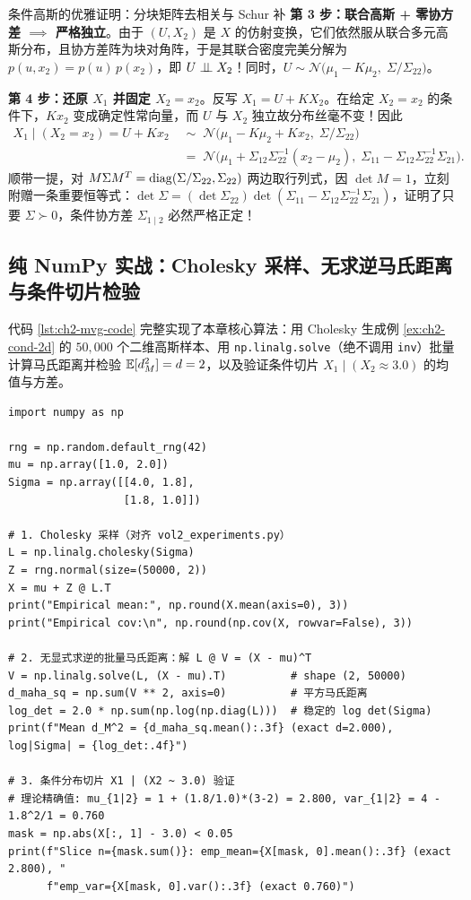 \begin{extBox}{条件高斯的优雅证明：分块矩阵去相关与 Schur 补}
\textbf{第 3 步：联合高斯 + 零协方差 $\implies$ 严格独立}。由于 $(U, X_2)$ 是 $X$ 的仿射变换，它们依然服从联合多元高斯分布，且协方差阵为块对角阵，于是其联合密度完美分解为 $p(u, x_2) = p(u)\,p(x_2)$，即 \textbf{$U \perp\!\!\!\perp X_2$}！同时，$U \sim \mathcal{N}\bigl(\mu_1 - K\mu_2,\; \Sigma / \Sigma_{22}\bigr)$。

\textbf{第 4 步：还原 $X_1$ 并固定 $X_2 = x_2$}。反写 $X_1 = U + K X_2$。在给定 $X_2 = x_2$ 的条件下，$K x_2$ 变成确定性常向量，而 $U$ 与 $X_2$ 独立故分布丝毫不变！因此
\begin{align*}
  X_1 \mid (X_2 = x_2) = U + K x_2
  &\;\sim\; \mathcal{N}\bigl(\mu_1 - K\mu_2 + K x_2,\; \Sigma / \Sigma_{22}\bigr) \\
  &\;=\; \mathcal{N}\bigl(\mu_1 + \Sigma_{12}\Sigma_{22}^{-1}(x_2 - \mu_2),\; \Sigma_{11} - \Sigma_{12}\Sigma_{22}^{-1}\Sigma_{21}\bigr).
\end{align*}
顺带一提，对 $M\Sigma M^T = \operatorname{diag}(\Sigma / \Sigma_{22}, \Sigma_{22})$ 两边取行列式，因 $\det M = 1$，立刻附赠一条重要恒等式：$\det\Sigma = (\det\Sigma_{22})\det(\Sigma_{11} - \Sigma_{12}\Sigma_{22}^{-1}\Sigma_{21})$，证明了只要 $\Sigma \succ 0$，条件协方差 $\Sigma_{1\mid 2}$ 必然严格正定！
\end{extBox}

\subsection{纯 NumPy 实战：Cholesky 采样、无求逆马氏距离与条件切片检验}

代码 \ref{lst:ch2-mvg-code} 完整实现了本章核心算法：用 Cholesky 生成例 \ref{ex:ch2-cond-2d} 的 $50{,}000$ 个二维高斯样本、用 \texttt{np.linalg.solve}（绝不调用 \texttt{inv}）批量计算马氏距离并检验 $\mathbb{E}[d_M^2]=d=2$，以及验证条件切片 $X_1\mid(X_2\approx 3.0)$ 的均值与方差。

\begin{lstlisting}[caption={纯 NumPy 多元高斯 Cholesky 采样、无求逆马氏距离与条件切片实测}, label={lst:ch2-mvg-code}]
import numpy as np

rng = np.random.default_rng(42)
mu = np.array([1.0, 2.0])
Sigma = np.array([[4.0, 1.8],
                  [1.8, 1.0]])

# 1. Cholesky 采样（对齐 vol2_experiments.py）
L = np.linalg.cholesky(Sigma)
Z = rng.normal(size=(50000, 2))
X = mu + Z @ L.T
print("Empirical mean:", np.round(X.mean(axis=0), 3))
print("Empirical cov:\n", np.round(np.cov(X, rowvar=False), 3))

# 2. 无显式求逆的批量马氏距离：解 L @ V = (X - mu)^T
V = np.linalg.solve(L, (X - mu).T)          # shape (2, 50000)
d_maha_sq = np.sum(V ** 2, axis=0)          # 平方马氏距离
log_det = 2.0 * np.sum(np.log(np.diag(L)))  # 稳定的 log det(Sigma)
print(f"Mean d_M^2 = {d_maha_sq.mean():.3f} (exact d=2.000), log|Sigma| = {log_det:.4f}")

# 3. 条件分布切片 X1 | (X2 ~ 3.0) 验证
# 理论精确值: mu_{1|2} = 1 + (1.8/1.0)*(3-2) = 2.800, var_{1|2} = 4 - 1.8^2/1 = 0.760
mask = np.abs(X[:, 1] - 3.0) < 0.05
print(f"Slice n={mask.sum()}: emp_mean={X[mask, 0].mean():.3f} (exact 2.800), "
      f"emp_var={X[mask, 0].var():.3f} (exact 0.760)")
\end{lstlisting}

